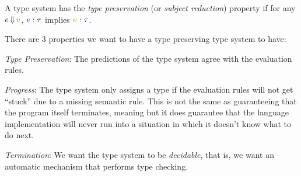 \begin{definition}\label{def:Type_Preservation}
  A type system has the \emph{type preservation} (or \emph{subject reduction}) property if for any $e \EvaluatesTo \SemanticValue{v}$, $e : \DataType$ implies $\SemanticValue{v} : \DataType$.

  There are 3 properties we want to have a type preserving type system to have:
  \begin{propertylist}
  \item \emph{Type Preservation}: The predictions of the type system agree with the evaluation rules.\label{prop:Type_Preservation-Preservation}
  \item \emph{Progress}: The type system only assigns a type if the evaluation rules will not get ``stuck'' due to a missing semantic rule. This is not the same as guaranteeing that the program itself terminates, meaning but it does guarantee that the language implementation will never run into a situation in which it doesn't know what to do next.\label{prop:Type_Preservation-Progress}
  \item \emph{Termination}: We want the type system to be \emph{decidable}, that is, we want an automatic mechanism that performs type checking.\label{prop:Type_Preservation-Termination}
  \end{propertylist}
\end{definition}

